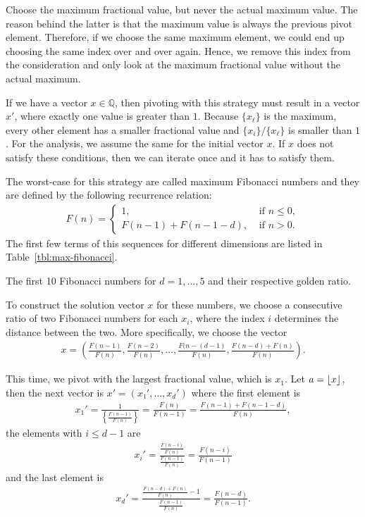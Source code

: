 Choose the maximum fractional value, but never the actual maximum value.
The reason behind the latter is that the maximum value is always the previous
pivot element.
Therefore, if we choose the same maximum element, we could end up choosing the
same index over and over again.
Hence, we remove this index from the consideration and only look at the maximum
fractional value without the actual maximum.

If we have a vector $x ∈ ℚ$, then pivoting with this strategy must result in a
vector $x'$, where exactly one value is greater than $1$.
Because $\{x_ℓ\}$ is the maximum, every other element has a smaller fractional
value and $\{x_i\}/\{x_ℓ\}$ is smaller than $1$.
For the analysis, we assume the same for the initial vector $x$.
If $x$ does not satisfy these conditions, then we can iterate once and it has
to satisfy them.

The worst-case for this strategy are called maximum Fibonacci numbers and they
are defined by the following recurrence relation:
\begin{align*}
  F(n) =
  \begin{cases}
    1, & \text{ if } n ≤ 0, \\
    F(n - 1) + F(n - 1 - d), & \text{ if } n > 0.
  \end{cases}
\end{align*}
The first few terms of this sequences for different dimensions are listed in
Table~\ref{tbl:max-fibonacci}.

\begin{table}[tbp]
  \caption{The first 10 Fibonacci numbers for $d = 1, …, 5$ and their respective golden ratio.}
  \label{tbl:max-fibonacci}
  \centering
  
\end{table}

To construct the solution vector $x$ for these numbers, we choose a consecutive
ratio of two Fibonacci numbers for each $x_i$, where the index $i$ determines
the distance between the two.
More specifically, we choose the vector
\begin{align*}
  x = \left(
    \frac{F(n-1)}{F(n)},
    \frac{F(n-2)}{F(n)},
    …,
    \frac{F(n-(d-1)}{F(n)},
    \frac{F(n-d) + F(n)}{F(n)} \right).
\end{align*}

This time, we pivot with the largest fractional value, which is $x_1$.
Let $a = \left\lfloor x\right\rfloor$, then the next vector is $x' = (x₁', …, x_d')$ where
the first element is
\begin{align*}
  x_1'
  = \frac{1}{\left\{\frac{F(n-1)}{F(n)}\right\}}
  = \frac{F(n)}{F(n-1)}
  = \frac{F(n-1) + F(n-1-d)}{F(n)},
\end{align*}
the elements with $i ≤ d - 1$ are
\begin{align*}
  x_i'
  = \frac{\frac{F(n-i)}{F(n)}}{\frac{F(n-1)}{F(n)}}
  = \frac{F(n-i)}{F(n-1)}
\end{align*}
and the last element is
\begin{align*}
  x_d'
  = \frac{\frac{F(n-d) + F(n)}{F(n)} - 1}{\frac{F(n-1)}{F(n)}}
  = \frac{F(n-d)}{F(n-1)}.
\end{align*}

